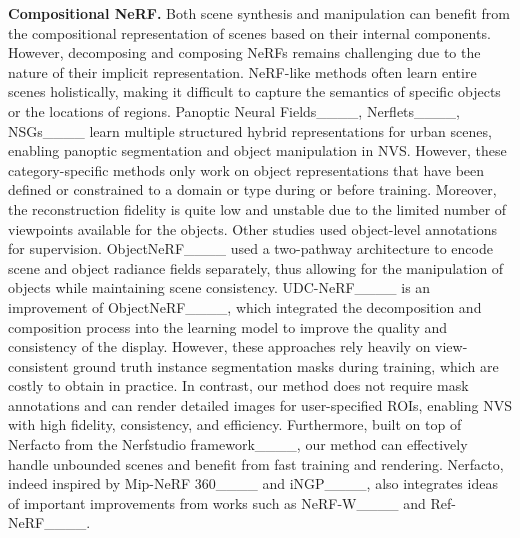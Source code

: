\textbf{Compositional NeRF.} Both scene synthesis and manipulation can benefit from the compositional representation of scenes based on their internal components. However, decomposing and composing NeRFs remains challenging due to the nature of their implicit representation. NeRF-like methods often learn entire scenes holistically, making it difficult to capture the semantics of specific objects or the locations of regions.
Panoptic Neural Fields____, Nerflets____, NSGs____ learn multiple structured hybrid representations for urban scenes, enabling panoptic segmentation and object manipulation in NVS.
However, these category-specific methods only work on object representations that have been defined or constrained to a domain or type during or before training.
Moreover, the reconstruction fidelity is quite low and unstable due to the limited number of viewpoints available for the objects.
Other studies used object-level annotations for supervision.
ObjectNeRF____ used a two-pathway architecture to encode scene and object radiance fields separately, thus allowing for the manipulation of objects while maintaining scene consistency.
UDC-NeRF____ is an improvement of ObjectNeRF____, which integrated the decomposition and composition process into the learning model to improve the quality and consistency of the display.
However, these approaches rely heavily on view-consistent ground truth instance segmentation masks during training, which are costly to obtain in practice.
In contrast, our method does not require mask annotations and can render detailed images for user-specified ROIs, enabling NVS with high fidelity, consistency, and efficiency. 
Furthermore, built on top of Nerfacto from the Nerfstudio framework____, our method can effectively handle unbounded scenes and benefit from fast training and rendering. 
Nerfacto, indeed inspired by Mip-NeRF 360____ and iNGP____, also integrates ideas of important improvements from works such as NeRF-W____ and Ref-NeRF____.